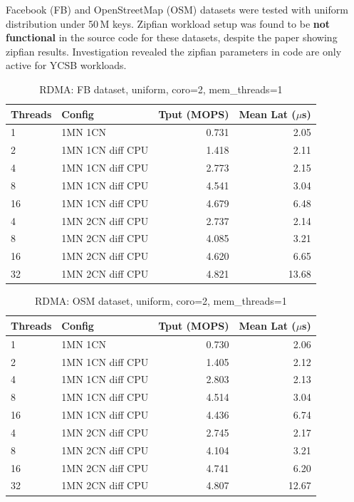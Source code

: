 \documentclass[11pt,a4paper]{article}
\begin{document}
Facebook (FB) and OpenStreetMap (OSM) datasets were tested with uniform distribution under 50\,M keys. Zipfian workload setup was found to be \textbf{not functional} in the source code for these datasets, despite the paper showing zipfian results. Investigation revealed the zipfian parameters in code are only active for YCSB workloads.

\begin{table}[H]
\centering
\caption{RDMA: FB dataset, uniform, coro=2, mem\_threads=1}
\label{tab:rdma-fb}
\small
\begin{tabular}{@{}llrr@{}}
\toprule
\textbf{Threads} & \textbf{Config} & \textbf{Tput (MOPS)} & \textbf{Mean Lat ($\mu$s)} \\
\midrule
1  & 1MN 1CN             & 0.731 & 2.05 \\
2  & 1MN 1CN diff CPU    & 1.418 & 2.11 \\
4  & 1MN 1CN diff CPU    & 2.773 & 2.15 \\
8  & 1MN 1CN diff CPU    & 4.541 & 3.04 \\
16 & 1MN 1CN diff CPU    & 4.679 & 6.48 \\
\midrule
4  & 1MN 2CN diff CPU    & 2.737 & 2.14 \\
8  & 1MN 2CN diff CPU    & 4.085 & 3.21 \\
16 & 1MN 2CN diff CPU    & 4.620 & 6.65 \\
32 & 1MN 2CN diff CPU    & 4.821 & 13.68 \\
\bottomrule
\end{tabular}
\end{table}

\begin{table}[H]
\centering
\caption{RDMA: OSM dataset, uniform, coro=2, mem\_threads=1}
\label{tab:rdma-osm}
\small
\begin{tabular}{@{}llrr@{}}
\toprule
\textbf{Threads} & \textbf{Config} & \textbf{Tput (MOPS)} & \textbf{Mean Lat ($\mu$s)} \\
\midrule
1  & 1MN 1CN             & 0.730 & 2.06 \\
2  & 1MN 1CN diff CPU    & 1.405 & 2.12 \\
4  & 1MN 1CN diff CPU    & 2.803 & 2.13 \\
8  & 1MN 1CN diff CPU    & 4.514 & 3.04 \\
16 & 1MN 1CN diff CPU    & 4.436 & 6.74 \\
\midrule
4  & 1MN 2CN diff CPU    & 2.745 & 2.17 \\
8  & 1MN 2CN diff CPU    & 4.104 & 3.21 \\
16 & 1MN 2CN diff CPU    & 4.741 & 6.20 \\
32 & 1MN 2CN diff CPU    & 4.807 & 12.67 \\
\bottomrule
\end{tabular}
\end{table}
\end{document}
